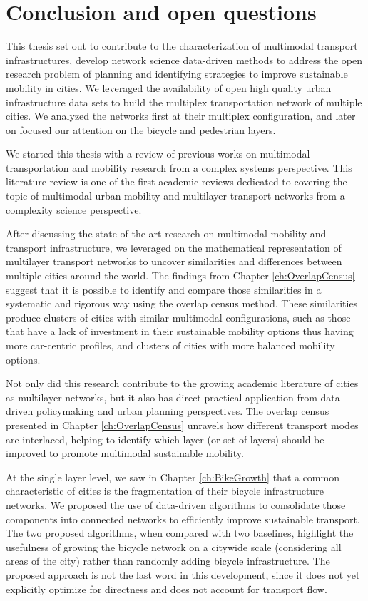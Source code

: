 \chapter{Conclusion and open questions}\label{ch:Conclusion}

This thesis set out to contribute to the characterization of multimodal transport infrastructures, develop network science data-driven methods to address the open research problem of planning and identifying strategies to improve sustainable mobility in cities. We leveraged the availability of open high quality urban infrastructure data sets to build the multiplex transportation network of multiple cities. We analyzed the networks first at their multiplex configuration, and later on focused our attention on the bicycle and pedestrian layers.

We started this thesis with a review of previous works on multimodal transportation and mobility research from a complex systems perspective. This literature review is one of the first academic reviews dedicated to covering the topic of multimodal urban mobility and multilayer transport networks from a complexity science perspective.

After discussing the state-of-the-art research on multimodal mobility and transport infrastructure, we leveraged on the mathematical representation of multilayer transport networks to uncover similarities and differences between multiple cities around the world. The findings from Chapter \ref{ch:OverlapCensus} suggest that it is possible to identify and compare those similarities in a systematic and rigorous way using the overlap census method. These similarities produce clusters of cities with similar multimodal configurations, such as those that have a lack of investment in their sustainable mobility options thus having more car-centric profiles, and clusters of cities with more balanced mobility options.

Not only did this research contribute to the growing academic literature of cities as multilayer networks, but it also has direct practical application from data-driven policymaking and urban planning perspectives. The overlap census presented in Chapter \ref{ch:OverlapCensus} unravels how different transport modes are interlaced, helping to identify which layer (or set of layers) should be improved to promote multimodal sustainable mobility.

At the single layer level, we saw in Chapter \ref{ch:BikeGrowth} that a common characteristic of cities is the fragmentation of their bicycle infrastructure networks. We proposed the use of data-driven algorithms to consolidate those components into connected networks to efficiently improve sustainable transport. The two proposed algorithms, when compared with two baselines, highlight the usefulness of growing the bicycle network on a citywide scale (considering all areas of the city) rather than randomly adding bicycle infrastructure. The proposed approach is not the last word in this development, since it does not yet explicitly optimize for directness and does not account for transport flow. 

